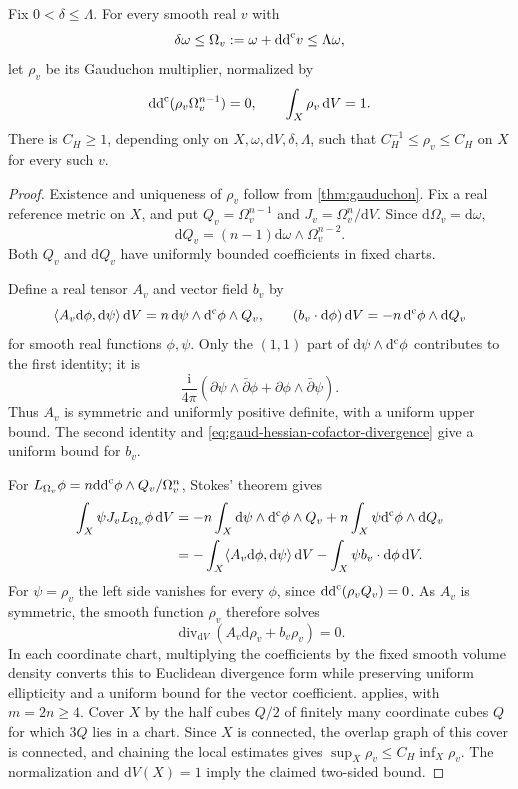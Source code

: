 \begin{proposition}\label{prop:gaud-hessian-factor-bounds}
Fix $0<\delta\leq\Lambda$. For every smooth real $v$ with
\[
 \delta\omega\leq\Omega_v:=\omega+\mathrm{dd}^{\mathrm{c}} v\leq\Lambda\omega,
\]
let $\rho_v$ be its Gauduchon multiplier, normalized by
\[
 \mathrm{dd}^{\mathrm{c}}(\rho_v\Omega_v^{n-1})=0,
 \qquad \int_X\rho_v\,\mathrm{d}V=1.
\]
There is $C_H\geq1$, depending only on $X,\omega,\mathrm{d}V,\delta,\Lambda$, such that $C_H^{-1}\leq\rho_v\leq C_H$ on $X$ for every such $v$.
\end{proposition}
\begin{proof}
Existence and uniqueness of $\rho_v$ follow from \cref{thm:gauduchon}. Fix a real reference metric on $X$, and put $Q_v=\Omega_v^{n-1}$ and $J_v=\Omega_v^n/\mathrm{d}V$. Since $\mathrm d\Omega_v=\mathrm d\omega$,
\begin{equation}\label{eq:gaud-hessian-cofactor-divergence}
 \mathrm dQ_v=(n-1)\mathrm d\omega\wedge\Omega_v^{n-2}.
\end{equation}
Both $Q_v$ and $\mathrm dQ_v$ have uniformly bounded coefficients in fixed charts.

Define a real tensor $A_v$ and vector field $b_v$ by
\[
 \langle A_v\mathrm d\phi,\mathrm d\psi\rangle\,\mathrm{d}V
       =n\,\mathrm d\psi\wedge\mathrm d^{\mathrm c}\phi\wedge Q_v,
 \qquad
 (b_v\cdot\mathrm d\phi)\,\mathrm{d}V
       =-n\,\mathrm d^{\mathrm c}\phi\wedge\mathrm dQ_v
\]
for smooth real functions $\phi,\psi$. Only the $(1,1)$ part of $\mathrm d\psi\wedge\mathrm d^{\mathrm c}\phi$ contributes to the first identity; it is
\[
 \frac{\mathrm i}{4\pi}
 (\partial\psi\wedge\bar\partial\phi
       +\partial\phi\wedge\bar\partial\psi).
\]
Thus $A_v$ is symmetric and uniformly positive definite, with a uniform upper bound. The second identity and \eqref{eq:gaud-hessian-cofactor-divergence} give a uniform bound for $b_v$.

For $L_{\Omega_v}\phi=n\mathrm{dd}^{\mathrm{c}}\phi\wedge Q_v/\Omega_v^n$, Stokes' theorem gives
\begin{align*}
 \int_X\psi J_vL_{\Omega_v}\phi\,\mathrm{d}V
 &=-n\int_X\mathrm d\psi\wedge\mathrm d^{\mathrm c}\phi\wedge Q_v
          +n\int_X\psi\mathrm d^{\mathrm c}\phi\wedge\mathrm dQ_v\\
 &=-\int_X\langle A_v\mathrm d\phi,\mathrm d\psi\rangle\,\mathrm{d}V
          -\int_X\psi b_v\cdot\mathrm d\phi\,\mathrm{d}V.
\end{align*}
For $\psi=\rho_v$ the left side vanishes for every $\phi$, since $\mathrm{dd}^{\mathrm{c}}(\rho_vQ_v)=0$. As $A_v$ is symmetric, the smooth function $\rho_v$ therefore solves
\[
 \operatorname{div}_{\mathrm{d}V}(A_v\mathrm d\rho_v+b_v\rho_v)=0.
\]
In each coordinate chart, multiplying the coefficients by the fixed smooth volume density converts this to Euclidean divergence form while preserving uniform ellipticity and a uniform bound for the vector coefficient.  applies, with $m=2n\geq4$. Cover $X$ by the half cubes $Q/2$ of finitely many coordinate cubes $Q$ for which $3Q$ lies in a chart. Since $X$ is connected, the overlap graph of this cover is connected, and chaining the local estimates gives $\sup_X\rho_v\leq C_H\inf_X\rho_v$. The normalization and $\mathrm{d}V(X)=1$ imply the claimed two-sided bound.
\end{proof}


